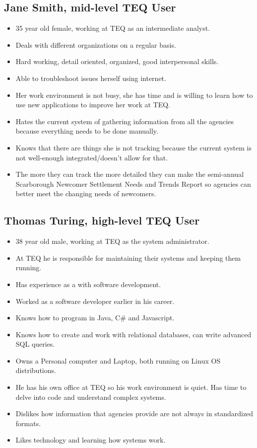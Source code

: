 \documentclass[12pt]{article}
\begin{document}
 \subsection{Jane Smith, mid-level TEQ User}
\begin{itemize}%
\item 35 year old female, working at TEQ as an intermediate analyst.
\item Deals with different organizations on a regular basis.
\item Hard working, detail oriented, organized, good interpersonal skills.
\item Able to troubleshoot issues herself using internet.
\item Her work environment is not busy, she has time and is willing to learn how to use new applications to improve her work at TEQ.
\item Hates the current system of gathering information from all the agencies because everything needs to be done manually.
\item Knows that there are things she is not tracking because the current system is not well-enough integrated/doesn’t allow for that.
\item The more they can track the more detailed they can make the semi-annual Scarborough Newcomer Settlement Needs and Trends Report so agencies can better meet the changing needs of newcomers.
 \end{itemize}
 
  \subsection{Thomas Turing, high-level TEQ User}
\begin{itemize}%
\item 38 year old male, working at TEQ as the system administrator.
\item At TEQ he is responsible for maintaining their systems and keeping them running.
\item Has experience as a with software development.
\item Worked as a software developer earlier in his career.
\item Knows how to program in Java, C\# and Javascript. 
\item Knows how to create and work with relational databases, can write advanced SQL queries.
\item Owns a Personal computer and Laptop, both running on Linux OS distributions.
\item He has his own office at TEQ so his work environment is quiet. Has time to delve into code and understand complex systems.
\item Dislikes how information that agencies provide are not always in standardized formats.
\item Likes technology and learning how systems work.

 \end{itemize}
 
\end{document}
